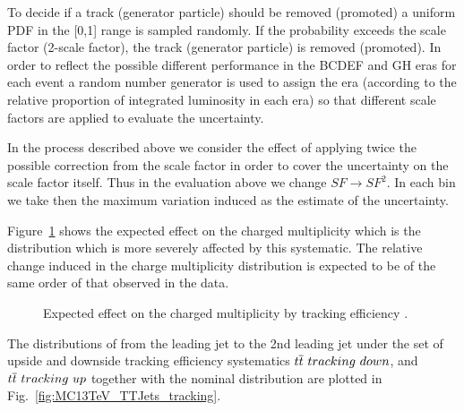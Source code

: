 \begin{description}
To decide if a track (generator particle) should be removed (promoted) a uniform PDF in the [0,1] range is sampled randomly. If the probability exceeds the scale factor (2-scale factor), the track (generator particle) is removed (promoted). In order to reflect the possible different performance in the BCDEF and GH eras for each event a random number generator is used to assign the era (according to the relative proportion of integrated luminosity in each era) so that different scale factors are applied to evaluate the uncertainty.

In the process described above we consider the effect of applying twice the possible correction from the scale factor in order to cover the uncertainty on the scale factor itself. Thus in the evaluation above we change $SF\rightarrow SF^2$. In each bin we take then the maximum variation induced as the estimate of the uncertainty. 

Figure~\ref{fig:tkeffsysts} shows the expected effect on the charged multiplicity which is the distribution which is more severely affected by this systematic. The relative change induced in the charge multiplicity distribution is expected to be of the same order of that observed in the data.

\begin{figure}[!htp]
\centering
{}\hfil
{}
\caption{Expected effect on the charged multiplicity by tracking efficiency \cite{CMS-AN-2017-175}.}
\label{fig:tkeffsysts}
\end{figure}

The distributions of \pullangle from the leading jet \leadingjet to the 2nd leading jet \scndleadingjet under the set of upside and downside tracking efficiency systematics $t\overline{t}\ tracking\ down$, and $t\overline{t}\ tracking\ up$ together with the nominal distribution are plotted in Fig.~\ref{fig:MC13TeV_TTJets_tracking}.



\end{description}
